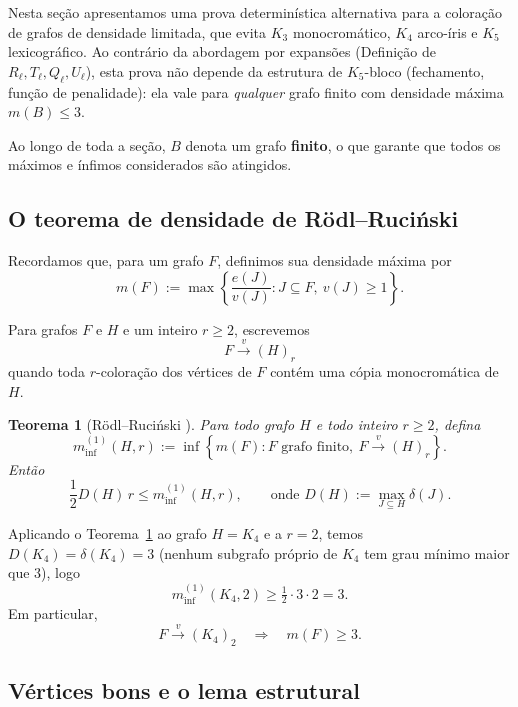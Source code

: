 \documentclass[reqno, 12pt]{amsart}
\numberwithin{equation}{section}
\theoremstyle{plain}
\newtheorem{theorem}{Teorema}[section]
\theoremstyle{definition}
\begin{document}
Nesta seção apresentamos uma prova determinística alternativa para a
coloração de grafos de densidade limitada, que evita $K_3$
monocromático, $K_4$ arco-íris e $K_5$ lexicográfico. Ao contrário da
abordagem por expansões (Definição de $R_\ell, T_\ell, Q_\ell, U_\ell$),
esta prova não depende da estrutura de $K_5$-bloco (fechamento,
função de penalidade): ela vale para \emph{qualquer} grafo finito com
densidade máxima $m(B) \leq 3$.

Ao longo de toda a seção, $B$ denota um grafo \textbf{finito}, o que
garante que todos os máximos e ínfimos considerados são atingidos.

\subsection{O teorema de densidade de Rödl--Ruciński}

Recordamos que, para um grafo $F$, definimos sua densidade máxima por
\[
  m(F)
  :=
  \max\left\{
  \frac{e(J)}{v(J)}
  :
  J\subseteq F,\ v(J)\geq 1
  \right\}.
\]

Para grafos $F$ e $H$ e um inteiro $r\geq 2$, escrevemos
\[
  F\xrightarrow{v}(H)_r
\]
quando toda $r$-coloração dos vértices de $F$ contém uma cópia
monocromática de $H$.

\begin{theorem}[Rödl--Ruciński {\cite[Theorem~5]{rodl1993lower}}]
  \label{thm:rr-vertex}
  Para todo grafo $H$ e todo inteiro $r\geq 2$, defina
  \[
    m_{\inf}^{(1)}(H,r)
    :=
    \inf\left\{
    m(F):
    F \text{ grafo finito},\ F\xrightarrow{v}(H)_r
    \right\}.
  \]
  Então
  \[
    \frac{1}{2}D(H)\,r
    \leq
    m_{\inf}^{(1)}(H,r),
    \qquad\text{onde } D(H):=\max_{J\subseteq H}\delta(J).
  \]
\end{theorem}

Aplicando o Teorema~\ref{thm:rr-vertex} ao grafo $H=K_4$ e a $r=2$,
temos $D(K_4)=\delta(K_4)=3$ (nenhum subgrafo próprio de $K_4$ tem
grau mínimo maior que $3$), logo
\[
  m_{\inf}^{(1)}(K_4,2)\geq \tfrac{1}{2}\cdot 3\cdot 2=3.
\]
Em particular,
\begin{equation}
  \label{eq:rr-k4}
  F\xrightarrow{v}(K_4)_2
  \quad\Longrightarrow\quad
  m(F)\geq 3.
\end{equation}

\subsection{Vértices bons e o lema estrutural}
\end{document}

